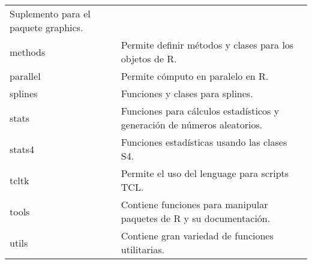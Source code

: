 \documentclass[]{book}
\begin{document}
\begin{longtable}[]{@{}ll@{}}
\begin{minipage}[t]{0.80\columnwidth}
Suplemento para el paquete graphics.\strut
\end{minipage}\tabularnewline
\begin{minipage}[t]{0.14\columnwidth}\raggedright
methods\strut
\end{minipage} & \begin{minipage}[t]{0.80\columnwidth}\raggedright
Permite definir métodos y clases para los objetos de R.\strut
\end{minipage}\tabularnewline
\begin{minipage}[t]{0.14\columnwidth}\raggedright
parallel\strut
\end{minipage} & \begin{minipage}[t]{0.80\columnwidth}\raggedright
Permite cómputo en paralelo en R.\strut
\end{minipage}\tabularnewline
\begin{minipage}[t]{0.14\columnwidth}\raggedright
splines\strut
\end{minipage} & \begin{minipage}[t]{0.80\columnwidth}\raggedright
Funciones y clases para splines.\strut
\end{minipage}\tabularnewline
\begin{minipage}[t]{0.14\columnwidth}\raggedright
stats\strut
\end{minipage} & \begin{minipage}[t]{0.80\columnwidth}\raggedright
Funciones para cálculos estadísticos y generación de números aleatorios.\strut
\end{minipage}\tabularnewline
\begin{minipage}[t]{0.14\columnwidth}\raggedright
stats4\strut
\end{minipage} & \begin{minipage}[t]{0.80\columnwidth}\raggedright
Funciones estadísticas usando las clases S4.\strut
\end{minipage}\tabularnewline
\begin{minipage}[t]{0.14\columnwidth}\raggedright
tcltk\strut
\end{minipage} & \begin{minipage}[t]{0.80\columnwidth}\raggedright
Permite el uso del lenguage para scripts TCL.\strut
\end{minipage}\tabularnewline
\begin{minipage}[t]{0.14\columnwidth}\raggedright
tools\strut
\end{minipage} & \begin{minipage}[t]{0.80\columnwidth}\raggedright
Contiene funciones para manipular paquetes de R y su documentación.\strut
\end{minipage}\tabularnewline
\begin{minipage}[t]{0.14\columnwidth}\raggedright
utils\strut
\end{minipage} & \begin{minipage}[t]{0.80\columnwidth}\raggedright
Contiene gran variedad de funciones utilitarias.\strut
\end{minipage}\tabularnewline
\bottomrule
\end{longtable}
\end{document}
